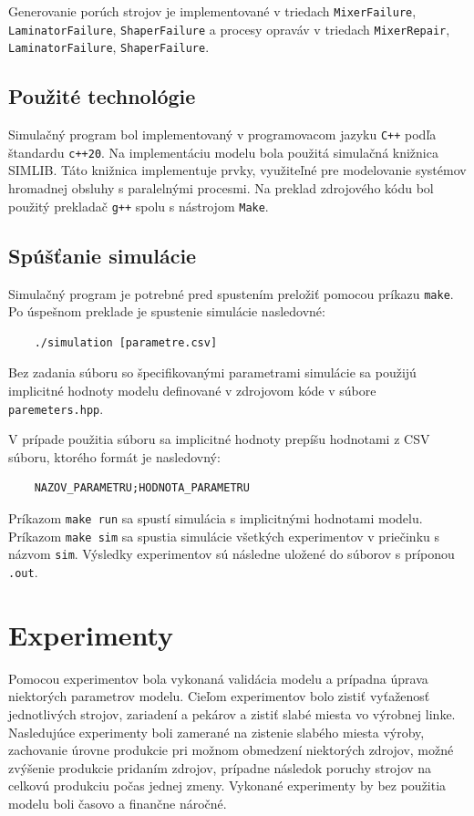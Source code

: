 \documentclass[11pt]{article}
\begin{document}
Generovanie porúch strojov je implementované v triedach \texttt{MixerFailure}, \texttt{LaminatorFailure}, \texttt{ShaperFailure}
a procesy opraváv v triedach \texttt{MixerRepair}, \texttt{LaminatorFailure}, \texttt{ShaperFailure}.

\subsection{Použité technológie}
Simulačný program bol implementovaný v programovacom jazyku \texttt{C++} podľa štandardu \texttt{c++20}. Na implementáciu modelu bola použitá simulačná knižnica \textsc{SIMLIB}. Táto knižnica implementuje prvky, využiteľné pre modelovanie systémov hromadnej obsluhy s paralelnými procesmi. Na preklad zdrojového kódu bol použitý prekladač \texttt{g++} spolu s nástrojom \texttt{Make}. 

\subsection{Spúšťanie simulácie}
 Simulačný program je potrebné pred spustením preložiť pomocou príkazu \texttt{make}. Po úspešnom preklade je spustenie simulácie nasledovné:
 
\begin{verbatim}
    ./simulation [parametre.csv]
\end{verbatim}

Bez zadania súboru so špecifikovanými parametrami simulácie sa použijú implicitné hodnoty modelu definované v zdrojovom kóde v súbore \texttt{paremeters.hpp}.\newline

V prípade použitia súboru sa implicitné hodnoty prepíšu hodnotami z \textsc{CSV} súboru, ktorého formát je nasledovný:

\begin{verbatim}
    NAZOV_PARAMETRU;HODNOTA_PARAMETRU
\end{verbatim}

Príkazom \texttt{make run} sa spustí simulácia s implicitnými hodnotami modelu. Príkazom \texttt{make sim} sa spustia simulácie všetkých experimentov v priečinku s názvom \texttt{sim}. Výsledky experimentov sú následne uložené do súborov s príponou \texttt{.out}.
 
\newpage
\section{Experimenty}
Pomocou experimentov bola vykonaná validácia modelu a prípadna úprava niektorých parametrov modelu. Cieľom experimentov bolo zistiť vyťaženosť jednotlivých strojov, zariadení a pekárov a zistiť slabé miesta vo výrobnej linke.
Nasledujúce experimenty boli zamerané na zistenie slabého miesta výroby, zachovanie úrovne produkcie pri možnom obmedzení niektorých zdrojov, možné zvýšenie produkcie pridaním zdrojov, prípadne následok poruchy strojov na celkovú produkciu počas jednej zmeny.
Vykonané experimenty by bez použitia modelu boli časovo a finančne náročné.
\end{document}
